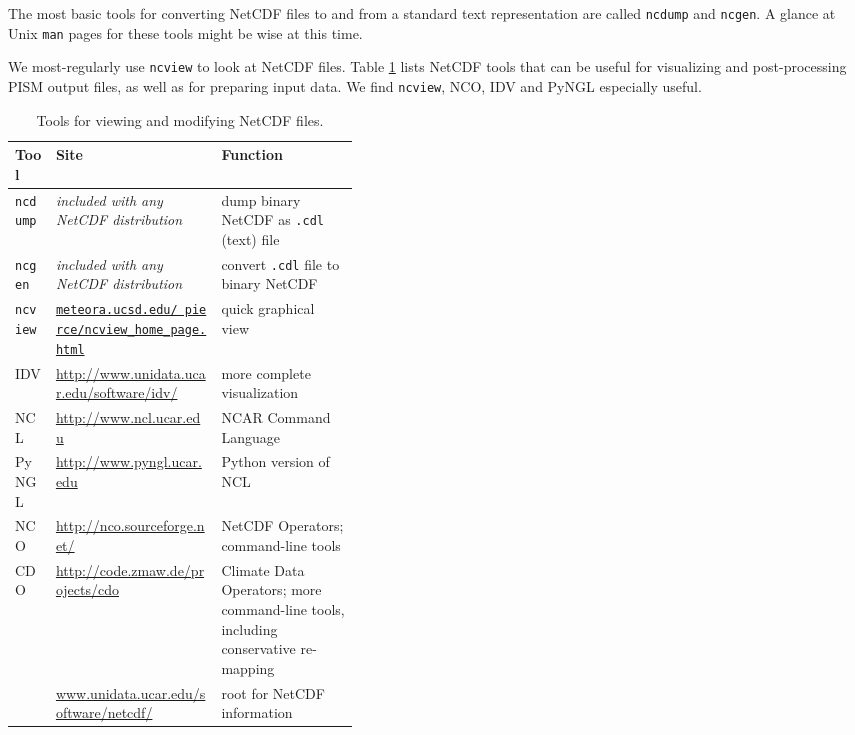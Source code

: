 The most basic tools for converting NetCDF files to and from a standard text representation are called \texttt{ncdump} and \texttt{ncgen}.  A glance at Unix \texttt{man} pages for these tools might be wise at this time.

We most-regularly use \texttt{ncview} to look at NetCDF files.  Table \ref{tab:NetCDFview} lists NetCDF tools that can be useful for visualizing and post-processing PISM output files, as well as for preparing input data.  We find \texttt{ncview}, NCO, IDV and PyNGL especially useful.

\newcommand{\netcdftool}[1]{#1\index{NetCDF!tools!#1}}
\begin{table}[ht]
\centering
\small
\begin{tabular}{llp{0.4\linewidth}}
  \toprule
  \textbf{Tool} & \textbf{Site} & \textbf{Function} \\
  \midrule
  \netcdftool{\texttt{ncdump}} & \emph{included with any NetCDF distribution} & dump binary NetCDF as \texttt{.cdl} (text) file \\
  \netcdftool{\texttt{ncgen}} & \emph{included with any NetCDF distribution} & convert \texttt{.cdl} file to binary NetCDF \\
  \netcdftool{\texttt{ncview}} & \href{http://meteora.ucsd.edu/~pierce/ncview_home_page.html}{\texttt{meteora.ucsd.edu/~pierce/ncview_home_page.html}} & quick graphical view \\
  \netcdftool{IDV} & \url{http://www.unidata.ucar.edu/software/idv/} & more complete visualization \\
  \netcdftool{NCL} &  \url{http://www.ncl.ucar.edu} & NCAR Command Language\\
  \netcdftool{PyNGL} &  \url{http://www.pyngl.ucar.edu} & Python version of NCL\\
  \netcdftool{NCO}\index{NCO (NetCDF Operators)} & \url{http://nco.sourceforge.net/} & NetCDF Operators; command-line tools\\
  \netcdftool{CDO} & \url{http://code.zmaw.de/projects/cdo} & Climate Data Operators; more command-line tools, including conservative re-mapping \\
  & \url{www.unidata.ucar.edu/software/netcdf/} & root for NetCDF information \\
  \bottomrule
\end{tabular}
\normalsize
\label{tab:NetCDFview}
\caption{Tools for viewing and modifying NetCDF files.}
\end{table}





